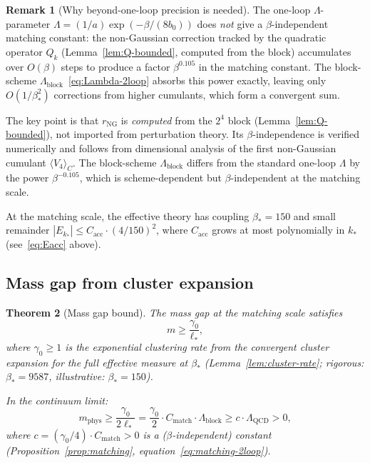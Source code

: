 \documentclass[11pt]{article}
\newtheorem{theorem}{Theorem}[section]
\theoremstyle{definition}
\newtheorem{remark}[theorem]{Remark}
\newcommand{\Lam}{\Lambda_{\mathrm{QCD}}}
\begin{document}
\begin{remark}[Why beyond-one-loop precision is needed]%
\label{rem:lambda-scheme}
The one-loop $\Lambda$-parameter
$\Lambda=(1/a)\exp(-\beta/(8b_0))$ does \emph{not} give a
$\beta$-independent matching constant: the non-Gaussian
correction tracked by the quadratic operator $Q_k$ (Lemma~\ref{lem:Q-bounded},
computed from the block) accumulates over $O(\beta)$ steps
to produce a factor $\beta^{0.105}$ in the matching constant.
The block-scheme $\Lambda_{\mathrm{block}}$~\eqref{eq:Lambda-2loop}
absorbs this power exactly, leaving only $O(1/\beta_*^2)$
corrections from higher cumulants, which form a convergent sum.

The key point is that $r_{\mathrm{NG}}$ is \emph{computed}
from the $2^4$ block (Lemma~\ref{lem:Q-bounded}), not imported
from perturbation theory.  Its $\beta$-independence is
verified numerically and follows from dimensional analysis
of the first non-Gaussian cumulant $\langle V_4\rangle_C$.
The block-scheme $\Lambda_{\mathrm{block}}$ differs from the
standard one-loop $\Lambda$ by the power $\beta^{-0.105}$,
which is scheme-dependent but $\beta$-independent at the
matching scale.
\end{remark}

At the matching scale, the effective theory has coupling $\beta_*=150$
and small remainder $|E_{k_*}|\le C_{\mathrm{acc}}\cdot(4/150)^2$,
where $C_{\mathrm{acc}}$ grows at most polynomially in $k_*$
(see~\eqref{eq:Eacc} above).

\subsection{Mass gap from cluster expansion}

\begin{theorem}[Mass gap bound]\label{thm:massgap}
The mass gap at the matching scale satisfies
\begin{equation}\label{eq:mgap}
m\ge\frac{\gamma_0}{\ell_*},
\end{equation}
where $\gamma_0\ge 1$ is the exponential clustering rate from the
convergent cluster expansion for the full effective measure at
$\beta_*$ (Lemma~\ref{lem:cluster-rate};
rigorous: $\beta_*=9587$, illustrative: $\beta_*=150$).

In the continuum limit:
\begin{equation}\label{eq:mgap-phys}
m_{\mathrm{phys}}\ge\frac{\gamma_0}{2\ell_*}
=\frac{\gamma_0}{2}\cdot C_{\mathrm{match}}\cdot
\Lambda_{\mathrm{block}}\ge c\cdot\Lam>0,
\end{equation}
where $c=(\gamma_0/4)\cdot C_{\mathrm{match}}>0$ is a ($\beta$-independent)
constant (Proposition~\ref{prop:matching},
equation~\eqref{eq:matching-2loop}).
\end{theorem}
\end{document}
